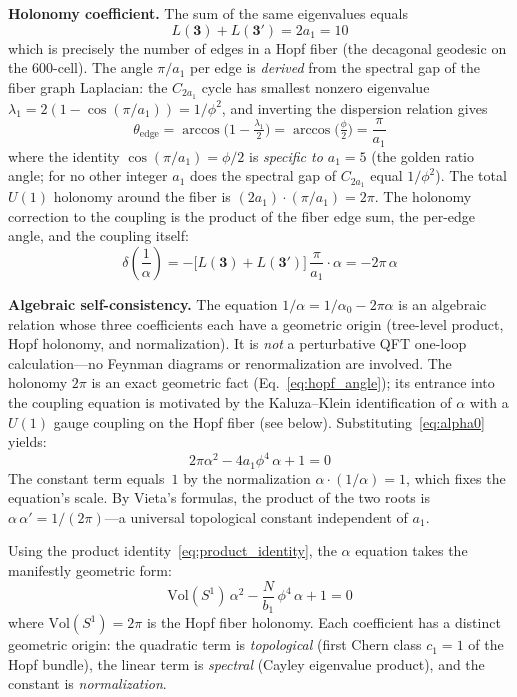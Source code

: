 \documentclass[12pt,a4paper]{article}
\theoremstyle{definition}
\begin{document}
\textbf{Holonomy coefficient.}  The sum of the same eigenvalues equals
\begin{equation}
L(\mathbf{3}) + L(\mathbf{3'}) = 2a_1 = 10
\end{equation}
which is precisely the number of edges in a Hopf fiber (the decagonal geodesic on the 600-cell).  The angle $\pi/a_1$ per edge is \emph{derived} from the spectral gap of the fiber graph Laplacian: the $C_{2a_1}$ cycle has smallest nonzero eigenvalue $\lambda_1 = 2(1 - \cos(\pi/a_1)) = 1/\phi^2$, and inverting the dispersion relation gives
\begin{equation}
\theta_{\mathrm{edge}} = \arccos\!\big(1 - \tfrac{\lambda_1}{2}\big) = \arccos\!\big(\tfrac{\phi}{2}\big) = \frac{\pi}{a_1}
\label{eq:hopf_angle}
\end{equation}
where the identity $\cos(\pi/a_1) = \phi/2$ is \emph{specific to $a_1 = 5$} (the golden ratio angle; for no other integer $a_1$ does the spectral gap of $C_{2a_1}$ equal $1/\phi^2$).  The total $U(1)$ holonomy around the fiber is $(2a_1)\cdot(\pi/a_1) = 2\pi$.  The holonomy correction to the coupling is the product of the fiber edge sum, the per-edge angle, and the coupling itself:
\begin{equation}
\delta\!\left(\frac{1}{\alpha}\right) = -\bigl[L(\mathbf{3}) + L(\mathbf{3'})\bigr]\,\frac{\pi}{a_1}\cdot\alpha = -2\pi\,\alpha
\end{equation}

\textbf{Algebraic self-consistency.}  The equation $1/\alpha = 1/\alpha_0 - 2\pi\alpha$ is an algebraic relation whose three coefficients each have a geometric origin (tree-level product, Hopf holonomy, and normalization).  It is \emph{not} a perturbative QFT one-loop calculation---no Feynman diagrams or renormalization are involved.  The holonomy $2\pi$ is an exact geometric fact (Eq.~\ref{eq:hopf_angle}); its entrance into the coupling equation is motivated by the Kaluza--Klein identification of $\alpha$ with a $U(1)$ gauge coupling on the Hopf fiber (see below).  Substituting~\eqref{eq:alpha0} yields:
\begin{equation}
\boxed{2\pi\alpha^2 - 4a_1\phi^4\,\alpha + 1 = 0}
\label{eq:alpha}
\end{equation}
The constant term equals~$1$ by the normalization $\alpha \cdot (1/\alpha) = 1$, which fixes the equation's scale.  By Vieta's formulas, the product of the two roots is $\alpha\,\alpha' = 1/(2\pi)$---a universal topological constant independent of $a_1$.

Using the product identity~\eqref{eq:product_identity}, the $\alpha$ equation takes the manifestly geometric form:
\begin{equation}
\mathrm{Vol}(S^1)\,\alpha^2 - \frac{N}{b_1}\,\phi^4\,\alpha + 1 = 0
\label{eq:alpha_geometric}
\end{equation}
where $\mathrm{Vol}(S^1) = 2\pi$ is the Hopf fiber holonomy.  Each coefficient has a distinct geometric origin: the quadratic term is \emph{topological} (first Chern class $c_1 = 1$ of the Hopf bundle), the linear term is \emph{spectral} (Cayley eigenvalue product), and the constant is \emph{normalization}.
\end{document}
